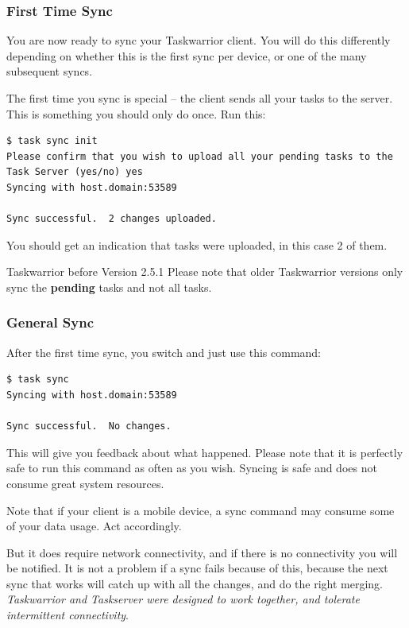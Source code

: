 \documentclass[t,handout]{beamer}
\begin{document}
\begin{frame}[fragile]\frametitle{First Time Sync}
    \vfill
    You are now ready to sync your Taskwarrior client. You will do this differently depending on whether this is the first sync per device, or one of the many subsequent syncs.

    The first time you sync is special -- the client sends all your tasks to the server.  This is something you should only do once.  Run this:

    \begin{lstlisting}
$ task sync init
Please confirm that you wish to upload all your pending tasks to the Task Server (yes/no) yes
Syncing with host.domain:53589

Sync successful.  2 changes uploaded.\end{lstlisting}

    You should get an indication that tasks were uploaded, in this case 2 of them.

    \begin{alertblock}{Taskwarrior before Version 2.5.1}
        Please note that older Taskwarrior versions only sync the \textbf{pending} tasks and not all tasks.
    \end{alertblock}
\end{frame}

\begin{frame}[fragile]\frametitle{General Sync}
    \vfill
    After the first time sync, you switch and just use this command:

    \begin{lstlisting}
$ task sync
Syncing with host.domain:53589

Sync successful.  No changes.\end{lstlisting}

    This will give you feedback about what happened. Please note that it is perfectly safe to run this command as often as you wish. Syncing is safe and does not consume great system resources.

    Note that if your client is a mobile device, a sync command may consume some of your data usage. Act accordingly.

    But it does require network connectivity, and if there is no connectivity you will be notified.  It is not a problem if a sync fails because of this, because the next sync that works will catch up with all the changes, and do the right merging. \emph{Taskwarrior and Taskserver were designed to work together, and tolerate intermittent connectivity}.
\end{frame}
\end{document}
